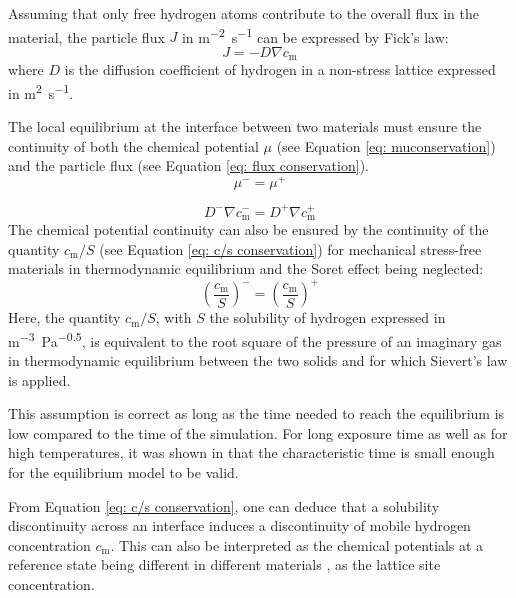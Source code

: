 Assuming that only free hydrogen atoms contribute to the overall flux in the material, the particle flux $J$ in \si{m^{-2}.s^{-1}} can be expressed by Fick's law:
\begin{equation}
    J = - D \nabla c_\mathrm{m}
\end{equation}
where $D$ is the diffusion coefficient of hydrogen in a non-stress lattice expressed in \si{m^{2}.s^{-1}}. 


The local equilibrium at the interface between two materials must ensure  the continuity of both the chemical potential $\mu$ (see Equation \ref{eq: muconservation}) and the particle flux (see Equation \ref{eq: flux conservation}).
\begin{equation}
    \mu^- = \mu^+  \label{eq: muconservation}  
\end{equation}
    
\begin{equation}
    D^- \nabla c_\mathrm{m}^- = D^+ \nabla c_\mathrm{m}^+ \label{eq: flux conservation} 
\end{equation}
The chemical potential continuity can also be ensured by the continuity of the quantity $c_\mathrm{m}/S$ (see Equation \ref{eq: c/s conservation}) for mechanical stress-free materials in thermodynamic equilibrium and the Soret effect being neglected:
\begin{equation}
    \left(\frac{c_\mathrm{m}}{S}\right)^- = \left(\frac{c_\mathrm{m}}{S}\right)^+  \label{eq: c/s conservation}  
\end{equation}
Here, the quantity $c_\mathrm{m}/S$, with $S$ the solubility of hydrogen expressed in \si{m^{-3}.Pa^{-0.5}}, is equivalent to the root square of the pressure of an imaginary gas in thermodynamic equilibrium between the two solids and for which Sievert's law is applied.  

This assumption is correct as long as the time needed to reach the equilibrium is low compared to the time of the simulation.
For long exposure time as well as for high temperatures, it was shown in  that the characteristic time is small enough for the equilibrium model to be valid.

From Equation \ref{eq: c/s conservation}, one can deduce that a solubility discontinuity across an interface induces a discontinuity of mobile hydrogen concentration $c_\mathrm{m}$.
This can also be interpreted as the chemical potentials at a reference state being different in different materials , as the lattice site concentration.

